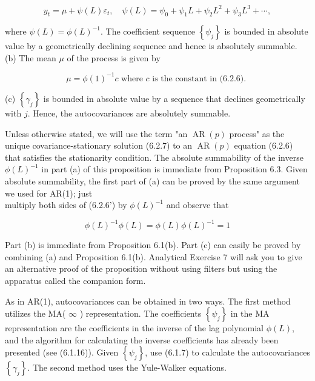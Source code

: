 \documentclass[10pt]{article}
\begin{document}
\begin{equation*}
y_{t}=\mu+\psi(L) \varepsilon_{t}, \quad \psi(L)=\psi_{0}+\psi_{1} L+\psi_{2} L^{2}+\psi_{3} L^{3}+\cdots, \tag{6.2.7}
\end{equation*}


where $\psi(L)=\phi(L)^{-1}$. The coefficient sequence $\left\{\psi_{j}\right\}$ is bounded in absolute value by a geometrically declining sequence and hence is absolutely summable.\\
(b) The mean $\mu$ of the process is given by


\begin{equation*}
\mu=\phi(1)^{-1} c \text { where } c \text { is the constant in (6.2.6). } \tag{6.2.8}
\end{equation*}


(c) $\left\{\gamma_{j}\right\}$ is bounded in absolute value by a sequence that declines geometrically with $j$. Hence, the autocovariances are absolutely summable.

Unless otherwise stated, we will use the term "an $\operatorname{AR}(p)$ process" as the unique covariance-stationary solution (6.2.7) to an $\operatorname{AR}(p)$ equation (6.2.6) that satisfies the stationarity condition. The absolute summability of the inverse $\phi(L)^{-1}$ in part (a) of this proposition is immediate from Proposition 6.3. Given absolute summability, the first part of (a) can be proved by the same argument we used for AR(1); just\\
multiply both sides of (6.2.6') by $\phi(L)^{-1}$ and observe that

$$
\phi(L)^{-1} \phi(L)=\phi(L) \phi(L)^{-1}=1
$$

Part (b) is immediate from Proposition 6.1(b). Part (c) can easily be proved by combining (a) and Proposition 6.1(b). Analytical Exercise 7 will ask you to give an alternative proof of the proposition without using filters but using the apparatus called the companion form.

As in AR(1), autocovariances can be obtained in two ways. The first method utilizes the MA( $\infty$ ) representation. The coefficients $\left\{\psi_{j}\right\}$ in the MA representation are the coefficients in the inverse of the lag polynomial $\phi(L)$, and the algorithm for calculating the inverse coefficients has already been presented (see (6.1.16)). Given $\left\{\psi_{j}\right\}$, use (6.1.7) to calculate the autocovariances $\left\{\gamma_{j}\right\}$. The second method uses the Yule-Walker equations.
\end{document}
